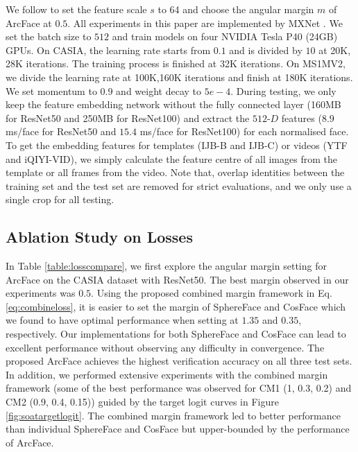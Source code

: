 \documentclass[10pt,twocolumn,letterpaper]{article}
\begin{document}
We follow \cite{tencent2017CosineFace} to set the feature scale $s$ to 64 and choose the angular margin $m$ of ArcFace at $0.5$. All experiments in this paper are implemented by MXNet \cite{chen2015mxnet}. We set the batch size to $512$ and train models on four NVIDIA Tesla P40 (24GB) GPUs. On CASIA, the learning rate starts from $0.1$ and is divided by $10$ at 20K, 28K iterations. The training process is finished at 32K iterations. On MS1MV2, we divide the learning rate at 100K,160K iterations and finish at 180K iterations. We set momentum to $0.9$ and weight decay to $5e-4$. During testing, we only keep the feature embedding network without the fully connected layer (160MB for ResNet50 and 250MB for ResNet100) and extract the $512$-$D$ features ($8.9$ ms/face for ResNet50 and $15.4$ ms/face for ResNet100) for each normalised face. To get the embedding features for templates (\eg IJB-B and IJB-C) or videos (\eg YTF and iQIYI-VID), we simply calculate the feature centre of all images from the template or all frames from the video. Note that, overlap identities between the training set and the test set are removed for strict evaluations, and we only use a single crop for all testing. 

\subsection{Ablation Study on Losses}

In Table \ref{table:losscompare}, we first explore the angular margin setting for ArcFace on the CASIA dataset with ResNet50. The best margin observed in our experiments was $0.5$. Using the proposed combined margin framework in Eq. \ref{eq:combineloss}, it is easier to set the margin of SphereFace and CosFace which we found to have optimal performance when setting at $1.35$ and $0.35$, respectively.  
Our implementations for both SphereFace and CosFace can lead to excellent performance without observing any difficulty in convergence. The proposed ArcFace achieves the highest verification accuracy on all three test sets. 
In addition, we performed extensive experiments with the combined margin framework (some of the best performance was observed for CM1 (1, 0.3, 0.2) and CM2 (0.9, 0.4, 0.15)) guided by the target logit curves in Figure \ref{fig:soatargetlogit}.  The combined margin framework led to better performance than individual SphereFace and CosFace but upper-bounded by the performance of ArcFace. 
\end{document}

